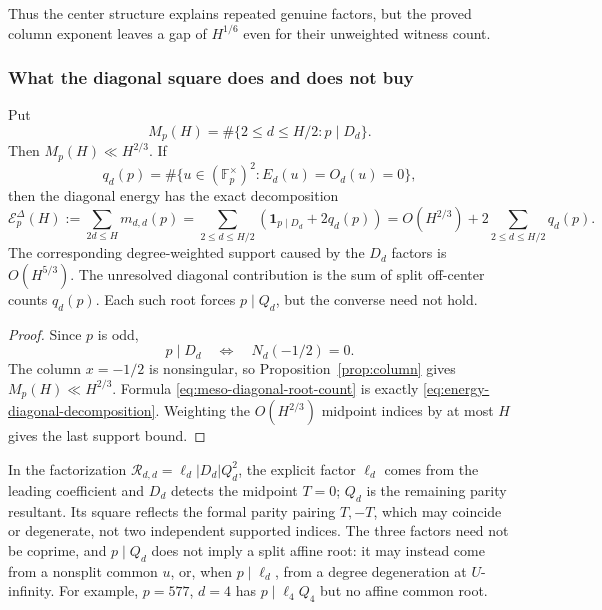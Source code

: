 Thus the center structure explains repeated genuine factors, but the
proved column exponent leaves a gap of $H^{1/6}$ even for their
unweighted witness count.

\subsubsection{What the diagonal square does and does not buy}

\begin{proposition}
\label{prop:energy-diagonal-decomposition}
Put
\[
 M_p(H)=\#\{2\leq d\leq H/2:p\mid D_d\}.
\]
Then $M_p(H)\ll H^{2/3}$.  If
\[
 q_d(p)=\#\{u\in(\mathbb F_p^\times)^2:
                   E_d(u)=O_d(u)=0\},
\]
then the diagonal energy has the exact decomposition
\begin{equation}\label{eq:energy-diagonal-decomposition}
 \mathcal E_p^\Delta(H):=\sum_{2d\leq H}m_{d,d}(p)
 =\sum_{2\leq d\leq H/2}
   \left(\mathbf1_{p\mid D_d}+2q_d(p)\right)
 =O(H^{2/3})+2\sum_{2\leq d\leq H/2}q_d(p).
\end{equation}
The corresponding degree-weighted support caused by the $D_d$ factors
is $O(H^{5/3})$.  The unresolved diagonal contribution is the sum of
split off-center counts $q_d(p)$.  Each such root forces $p\mid Q_d$,
but the converse need not hold.
\end{proposition}

\begin{proof}
Since $p$ is odd,
\[
 p\mid D_d\quad\Longleftrightarrow\quad N_d(-1/2)=0.
\]
The column $x=-1/2$ is nonsingular, so
Proposition~\ref{prop:column} gives $M_p(H)\ll H^{2/3}$.  Formula
\eqref{eq:meso-diagonal-root-count} is exactly
\eqref{eq:energy-diagonal-decomposition}.  Weighting the
$O(H^{2/3})$ midpoint indices by at most $H$ gives the last support
bound.
\end{proof}

In the factorization
$\mathcal R_{d,d}=\ell_d|D_d|Q_d^2$, the explicit factor $\ell_d$
comes from the leading coefficient and $D_d$ detects the midpoint
$T=0$; $Q_d$ is the remaining parity resultant.  Its square reflects
the formal parity pairing $T,-T$, which may coincide or degenerate, not
two independent supported indices.
The three factors need not be coprime, and $p\mid Q_d$ does not imply a
split affine root: it may instead come from a nonsplit common $u$, or,
when $p\mid\ell_d$, from a degree degeneration at $U$-infinity.  For
example, $p=577$, $d=4$ has $p\mid\ell_4Q_4$ but no affine common root.

